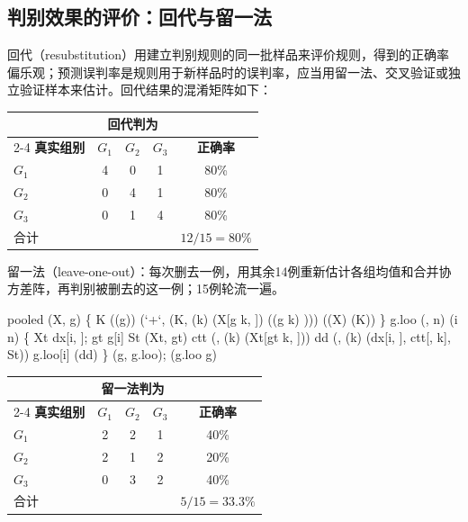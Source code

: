 \subsection{判别效果的评价：回代与留一法}\label{sec:loo}
回代（resubstitution）用建立判别规则的同一批样品来评价规则，得到的正确率偏乐观；预测误判率是规则用于新样品时的误判率，应当用留一法、交叉验证或独立验证样本来估计。回代结果的混淆矩阵如下：
\begin{center}\small\begin{tabular}{lcccc}\toprule
&\multicolumn{3}{c}{\bfseries 回代判为}&\\\cmidrule(lr){2-4}
{\bfseries 真实组别}&$G_1$&$G_2$&$G_3$&{\bfseries 正确率}\\\midrule
$G_1$&4&0&1&80\%\\$G_2$&0&4&1&80\%\\$G_3$&0&1&4&80\%\\\midrule
合计&&&&$12/15=80\%$\\\bottomrule
\end{tabular}\end{center}
留一法（leave-one-out）：每次删去一例，用其余14例重新估计各组均值和合并协方差阵，再判别被删去的这一例；15例轮流一遍。
\begin{code}
pooled \ROperator{<-} (X, g) \{          
  K \ROperator{<-} ((g))
  (`+`, (K, (k) (X[g \ROperator{==} k, ]) \ROperator{*} ((g \ROperator{==} k) \ROperator{-} ))) \ROperator{/} ((X) \ROperator{-} (K))
\}
g.loo \ROperator{<-} (, n)
 (i  \ROperator{:}n) \{
  Xt \ROperator{<-} dx[\ROperator{-}i, ]; gt \ROperator{<-} g[\ROperator{-}i]
  St \ROperator{<-} (Xt, gt)                       
  ctt \ROperator{<-} (\ROperator{:}, (k) (Xt[gt \ROperator{==} k, ]))
  dd \ROperator{<-} (\ROperator{:}, (k) (dx[i, ], ctt[, k], St))
  g.loo[i] \ROperator{<-} (dd)
\}
(g, g.loo); (g.loo \ROperator{==} g)
\end{code}
\begin{center}\small\begin{tabular}{lcccc}\toprule
&\multicolumn{3}{c}{\bfseries 留一法判为}&\\\cmidrule(lr){2-4}
{\bfseries 真实组别}&$G_1$&$G_2$&$G_3$&{\bfseries 正确率}\\\midrule
$G_1$&2&2&1&40\%\\$G_2$&2&1&2&20\%\\$G_3$&0&3&2&40\%\\\midrule
合计&&&&$5/15=33.3\%$\\\bottomrule
\end{tabular}\end{center}
